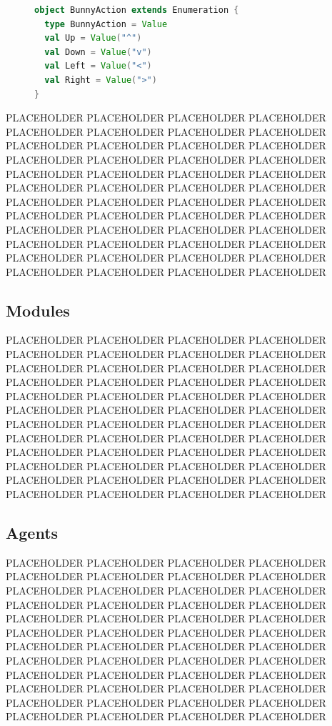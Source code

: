 \begin{figure}[ht]
\begin{center}

\begin{lstlisting}[language=Scala]
object BunnyAction extends Enumeration {
  type BunnyAction = Value
  val Up = Value("^")
  val Down = Value("v")
  val Left = Value("<")
  val Right = Value(">")
}
\end{lstlisting}

\caption{}
\end{center}
\label{fig:bunny-action-code}
\end{figure}


PLACEHOLDER PLACEHOLDER PLACEHOLDER PLACEHOLDER PLACEHOLDER PLACEHOLDER PLACEHOLDER PLACEHOLDER PLACEHOLDER PLACEHOLDER PLACEHOLDER PLACEHOLDER PLACEHOLDER PLACEHOLDER PLACEHOLDER PLACEHOLDER PLACEHOLDER PLACEHOLDER PLACEHOLDER PLACEHOLDER PLACEHOLDER PLACEHOLDER PLACEHOLDER PLACEHOLDER PLACEHOLDER PLACEHOLDER PLACEHOLDER PLACEHOLDER PLACEHOLDER PLACEHOLDER PLACEHOLDER PLACEHOLDER PLACEHOLDER PLACEHOLDER PLACEHOLDER PLACEHOLDER PLACEHOLDER PLACEHOLDER PLACEHOLDER PLACEHOLDER PLACEHOLDER PLACEHOLDER PLACEHOLDER PLACEHOLDER PLACEHOLDER PLACEHOLDER PLACEHOLDER PLACEHOLDER

\subsection{Modules}

PLACEHOLDER PLACEHOLDER PLACEHOLDER PLACEHOLDER PLACEHOLDER PLACEHOLDER PLACEHOLDER PLACEHOLDER PLACEHOLDER PLACEHOLDER PLACEHOLDER PLACEHOLDER PLACEHOLDER PLACEHOLDER PLACEHOLDER PLACEHOLDER PLACEHOLDER PLACEHOLDER PLACEHOLDER PLACEHOLDER PLACEHOLDER PLACEHOLDER PLACEHOLDER PLACEHOLDER PLACEHOLDER PLACEHOLDER PLACEHOLDER PLACEHOLDER PLACEHOLDER PLACEHOLDER PLACEHOLDER PLACEHOLDER PLACEHOLDER PLACEHOLDER PLACEHOLDER PLACEHOLDER PLACEHOLDER PLACEHOLDER PLACEHOLDER PLACEHOLDER PLACEHOLDER PLACEHOLDER PLACEHOLDER PLACEHOLDER PLACEHOLDER PLACEHOLDER PLACEHOLDER PLACEHOLDER

\subsection{Agents}

PLACEHOLDER PLACEHOLDER PLACEHOLDER PLACEHOLDER PLACEHOLDER PLACEHOLDER PLACEHOLDER PLACEHOLDER PLACEHOLDER PLACEHOLDER PLACEHOLDER PLACEHOLDER PLACEHOLDER PLACEHOLDER PLACEHOLDER PLACEHOLDER PLACEHOLDER PLACEHOLDER PLACEHOLDER PLACEHOLDER PLACEHOLDER PLACEHOLDER PLACEHOLDER PLACEHOLDER PLACEHOLDER PLACEHOLDER PLACEHOLDER PLACEHOLDER PLACEHOLDER PLACEHOLDER PLACEHOLDER PLACEHOLDER PLACEHOLDER PLACEHOLDER PLACEHOLDER PLACEHOLDER PLACEHOLDER PLACEHOLDER PLACEHOLDER PLACEHOLDER PLACEHOLDER PLACEHOLDER PLACEHOLDER PLACEHOLDER PLACEHOLDER PLACEHOLDER PLACEHOLDER PLACEHOLDER

